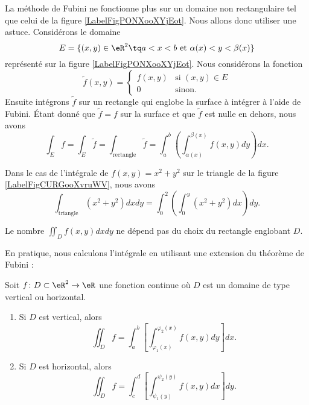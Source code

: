 \newcommand{\CaptionFigPONXooXYjEot}{Intégrer sur des domaines plus complexes.}


La méthode de Fubini ne fonctionne plus sur un domaine non rectangulaire tel que celui de la figure \ref{LabelFigPONXooXYjEot}. Nous allons donc utiliser une astuce. Considérons le domaine \begin{equation}
	E=\{ (x,y)\in\eR^2\tq a<x<b\text{ et } \alpha(x)<y<\beta(x) \}
\end{equation}
représenté sur la figure \ref{LabelFigPONXooXYjEot}. Nous considérons la fonction
\begin{equation}
	\tilde f(x,y)=\begin{cases}
	f(x,y)	&	\text{si }(x,y)\in E\\
	0	&	 \text{sinon.}
\end{cases}
\end{equation}
Ensuite intégrons $\tilde f$ sur un rectangle qui englobe la surface à intégrer à l'aide de Fubini. Étant donné que $\tilde f=f$ sur la surface et que $\tilde f$ est nulle en dehors, nous avons
\begin{equation}
	\int_Ef=\int_E\tilde f=\int_{\text{rectangle}}\tilde f=\int_a^b\left( \int_{\alpha(x)}^{\beta(x)}f(x,y)dy \right)dx.
\end{equation}

Dans le cas de l'intégrale de $f(x,y)=x^2+y^2$ sur le triangle de la figure \ref{LabelFigCURGooXvruWV}, nous avons
\begin{equation}
	\int_{\text{triangle}}(x^2+y^2)dx dy=\int_0^2\left( \int_0^y(x^2+y^2)dx \right)dy.
\end{equation}

\begin{remark}
    Le nombre $\iint_{D}f(x,y)dxdy$ ne dépend pas du choix du rectangle englobant $D$.
\end{remark}

En pratique, nous calculons l'intégrale en utilisant une extension du théorème de Fubini :
\begin{theorem}
    Soit $f\colon D\subset\eR^2\to \eR$ une fonction continue où $D$ est un domaine de type vertical ou horizontal.
    \begin{enumerate}
        \item
            Si $D$ est vertical, alors
            \begin{equation}
                \iint_Df=\int_a^b\left[ \int_{\varphi_1(x)}^{\varphi_2(x)}f(x,y)dy \right]dx.
            \end{equation}
        \item
            Si $D$ est horizontal, alors
            \begin{equation}
                \iint_Df=\int_c^d\left[ \int_{\psi_1(y)}^{\psi_2(y)}f(x,y)dx \right]dy.
            \end{equation}
    \end{enumerate}
    
\end{theorem}

